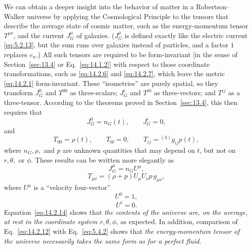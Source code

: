 We can obtain a deeper insight into the behavior of matter in a
Robertson--Walker universe by applying the Cosmological Principle to the
tensors that describe the average state of cosmic matter, such as the
energy-momentum tensor \(T^{\mu\nu}\), and the current \(J_G^\mu\) of
galaxies. (\(J_G^\mu\) is defined exactly like the electric current
\eqref{eq:5.2.13}, but the sum runs over galaxies instead of particles, and
a factor \(1\) replaces \(e_n\).) All such tensors are required to be
form-invariant [in the sense of Section~\ref{sec:13.4} or
Eq.~\eqref{eq:14.1.2}] with respect to those coordinate transformations,
such as \eqref{eq:14.2.6} and \eqref{eq:14.2.7}, which leave the metric
\eqref{eq:14.2.1} form-invariant. These ``isometries'' are purely spatial,
so they transform \(J_G^0\) and \(T^{00}\) as three-scalars;
\(J_G^i\) and \(T^{i0}\) as three-vectors; and \(T^{ij}\) as a
three-tensor. According to the theorems proved in Section~\ref{sec:13.4},
this then requires that
\begin{equation}
  J_G^0=n_G(t),
  \qquad
  J_G^i=0,
  \tag{14.2.9}\label{eq:14.2.9}
\end{equation}
and
\begin{equation}
  T_{00}=\rho(t),
  \qquad
  T_{0\ii}=0,
  \qquad
  T_{ij}={}^{(3)}g_{ij}p(t),
  \tag{14.2.10}\label{eq:14.2.10}
\end{equation}
where \(n_G,\rho,\) and \(p\) are unknown quantities that may depend on
\(t\), but not on \(r,\theta,\) or \(\phi\). These results can be written
more elegantly as
\begin{equation}
  J_G^\mu=n_GU^\mu,
  \tag{14.2.11}\label{eq:14.2.11}
\end{equation}
\begin{equation}
  T_{\mu\nu}
  =
  (\rho+p)U_\mu U_\nu
  p\,g_{\mu\nu},
  \tag{14.2.12}\label{eq:14.2.12}
\end{equation}
where \(U^\mu\) is a ``velocity four-vector''
\begin{equation}
  U^0=1,
  \tag{14.2.13}\label{eq:14.2.13}
\end{equation}
\begin{equation}
  U^i=0.
  \tag{14.2.14}\label{eq:14.2.14}
\end{equation}
Equation~\eqref{eq:14.2.14} shows that \emph{the contents of the universe
are, on the average, at rest in the coordinate system \(r,\theta,\phi\)}, as
expected. In addition, comparison of Eq.~\eqref{eq:14.2.12} with
Eq.~\eqref{eq:5.4.2} shows that \emph{the energy-momentum tensor of the
universe necessarily takes the same form as for a perfect fluid}.

